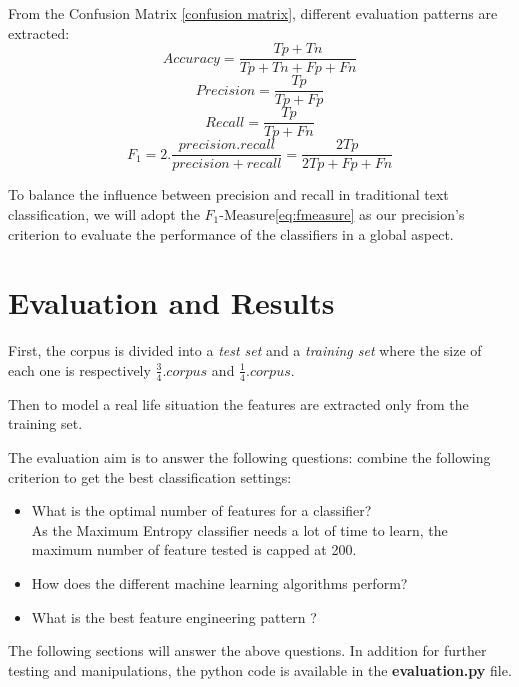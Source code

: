 From the Confusion Matrix \ref{confusion matrix}, different evaluation patterns are extracted:
\begin{equation}
\label{eq:accuracy}
Accuracy = \frac{Tp+Tn}{Tp+Tn+Fp+Fn}
\end{equation}
\begin{equation}
\label{eq:precision}
Precision = \frac{Tp}{Tp+Fp}
\end{equation}
\begin{equation}
\label{eq:recall}
Recall = \frac{Tp}{Tp+Fn}
\end{equation}
\begin{equation}
\label{eq:fmeasure}
F_1 = 2.\frac{precision . recall}{precision+recall} = \frac{2Tp}{2Tp+Fp+Fn}
\end{equation}


To balance the influence between precision and recall in
traditional text classification, we will adopt the $F_1$-Measure\ref{eq:fmeasure} as our precision's criterion to evaluate the performance of the classifiers in a
global aspect.


\section{Evaluation and Results}
First, the corpus is divided into a \emph{test set} and a \emph{training set} where the size of each one is respectively $ \frac{3}{4}.corpus$ and $ \frac{1}{4}.corpus$.

Then to model a real life situation the features are extracted only from the training set.




The evaluation aim is to answer the following questions: combine the following criterion to get the best classification settings:
\begin{itemize}
\item What is the optimal number of features for a classifier?\\
As the Maximum Entropy classifier needs a lot of time to learn, the maximum number of feature tested is capped at 200.
\item How does the different machine learning algorithms perform?
\item What is the best feature engineering pattern ?
\end{itemize}

The following sections will answer the above questions. In addition for further testing and manipulations, the python code is available in the \textbf{evaluation.py} file.


